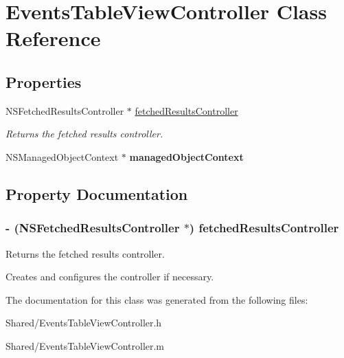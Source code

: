 \hypertarget{interface_events_table_view_controller}{
\section{EventsTableViewController Class Reference}
\label{interface_events_table_view_controller}
}
\subsection*{Properties}
\begin{DoxyCompactItemize}
\item 
NSFetchedResultsController $\ast$ \hyperlink{interface_events_table_view_controller_a500a3550b8bbe0c78f7f521e7d9be360}{fetchedResultsController}
\begin{DoxyCompactList}\small\item\em Returns the fetched results controller. \end{DoxyCompactList}\item 
\hypertarget{interface_events_table_view_controller_a975f838961f2966962b0fb157594bf8d}{
NSManagedObjectContext $\ast$ {\bfseries managedObjectContext}}
\label{interface_events_table_view_controller_a975f838961f2966962b0fb157594bf8d}

\end{DoxyCompactItemize}


\subsection{Property Documentation}
\hypertarget{interface_events_table_view_controller_a500a3550b8bbe0c78f7f521e7d9be360}{
\subsubsection[{fetchedResultsController}]{\setlength{\rightskip}{0pt plus 5cm}-\/ (NSFetchedResultsController $\ast$) fetchedResultsController}}
\label{interface_events_table_view_controller_a500a3550b8bbe0c78f7f521e7d9be360}


Returns the fetched results controller. 

Creates and configures the controller if necessary. 

The documentation for this class was generated from the following files:\begin{DoxyCompactItemize}
\item 
Shared/EventsTableViewController.h\item 
Shared/EventsTableViewController.m\end{DoxyCompactItemize}
